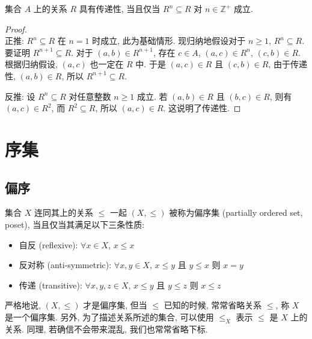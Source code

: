 \documentclass[UTF8]{ctexart}
\theoremstyle{mystyle}
\theoremstyle{myremark}
\theoremstyle{plain}
\newcommand{\Z}{\mathbb Z}
\begin{document}
\begin{theorem}
    集合 $ A $ 上的关系 $ R $ 具有传递性, 当且仅当 $ R^n \subseteq R $ 对 $ n \in \Z^+ $ 成立.
\end{theorem}

\begin{proof} \ \\
    正推: $ R^n \subseteq R $ 在 $ n = 1 $ 时成立, 此为基础情形. 现归纳地假设对于 $ n \geqslant 1 $, $ R^n \subseteq R $. 要证明 $ R^{n + 1} \subseteq R $. 对于 $ (a, b) \in R^{n + 1} $, 存在 $ c \in A $, $ (a, c) \in R^n $, $ (c, b) \in R $. 根据归纳假设, $ (a, c) $ 也一定在 $ R $ 中. 于是 $ (a, c) \in R $ 且 $ (c, b) \in R $, 由于传递性, $ (a, b) \in R $, 所以 $ R^{n + 1} \subseteq R $.
    
    反推: 设 $ R^n \subseteq R $ 对任意整数 $ n \geqslant 1 $ 成立. 若 $ (a, b) \in R $ 且 $ (b, c) \in R $, 则有 $ (a, c) \in R^2 $, 而 $ R^2 \subseteq R $, 所以 $ (a, c) \in R $. 这说明了传递性.
\end{proof}





\section{序集}
\subsection{偏序}
\begin{definition}
    集合 $ X $ 连同其上的关系 $ \le $ 一起 $ (X, \le) $ 被称为偏序集 (partially ordered set, poset), 当且仅当其满足以下三条性质:
    \begin{itemize}
        \item 自反 (reflexive): $ \forall x \in X $, $ x \le x $
        \item 反对称 (anti-symmetric): $ \forall x, y \in X $, $ x \le y $ 且 $ y \le x $ 则 $ x = y $
        \item 传递 (transitive): $ \forall x, y, z \in X $, $ x \le y $ 且 $ y \le z $ 则 $ x \le z $
    \end{itemize}
\end{definition}

严格地说, $ (X, \le) $ 才是偏序集, 但当 $ \le $ 已知的时候, 常常省略关系 $ \le $, 称 $ X $ 是一个偏序集. 另外, 为了描述关系所述的集合, 可以使用 $ \le_X $ 表示 $ \le $ 是 $ X $ 上的关系. 同理, 若确信不会带来混乱, 我们也常常省略下标.
\end{document}
